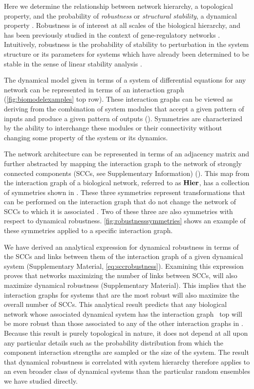 Here we determine the relationship between network hierarchy, a topological property, and the probability of \emph{robustness} or \emph{structural stability}, a dynamical property \cite{Smale1967}. Robustness is of interest at all scales of the biological hierarchy, and has been previously studied in the context of gene-regulatory networks \cite{WADDINGTON1942a,VanNimwegen1999,Siegal2002,Ciliberti2007b,Ciliberti2007,Wagner2013}. Intuitively, robustness is the probability of stability to perturbation in the system structure or its parameters for systems which have already been determined to be stable in the sense of linear stability analysis \cite{Davis1962}.

The dynamical model given in terms of a system of differential equations for any network can be represented in terms of an interaction graph (\ref{fig:biomodelexamples} top row). These interaction graphs can be viewed as deriving from the combination of system modules that accept a given pattern of inputs and produce a given pattern of outputs (). Symmetries are characterized by the ability to interchange these modules or their connectivity without changing some property of the system or its dynamics.

The network architecture can be represented in terms of an adjacency matrix and further abstracted by mapping the interaction graph to the network of strongly connected components (SCCs, see Supplementary Information) (). This map from the interaction graph of a biological network, referred to as $\mathbf{Hier}$, has a collection of symmetries shown in . These three symmetries represent transformations that can be performed on the interaction graph that do not change the network of SCCs to which it is associated . Two of these three are also symmetries with respect to dynamical robustness. \ref{fig:robustnesssymmetries} shows an example of these symmetries applied to a specific interaction graph.

We have derived an analytical expression for dynamical robustness in terms of the SCCs and links between them of the interaction graph of a given dynamical system (Supplementary Material, \ref{eq:sccrobustness}). Examining this expression proves that networks maximizing the number of links between SCCs, will also maximize dynamical robustness (Supplementary Material). This implies that the interaction graphs for systems that are the most robust will also maximize the overall number of SCCs. This analytical result predicts that any biological network whose associated dynamical system has the interaction graph  $\,$ top will be more robust than those associated to any of the other interaction graphs in . Because this result is purely topological in nature, it does not depend at all upon any particular details such as the probability distribution from which the component interaction strengths are sampled or the size of the system. The result that dynamical robustness is correlated with system hierarchy therefore applies to an even broader class of dynamical systems than the particular random ensembles we have studied directly.

